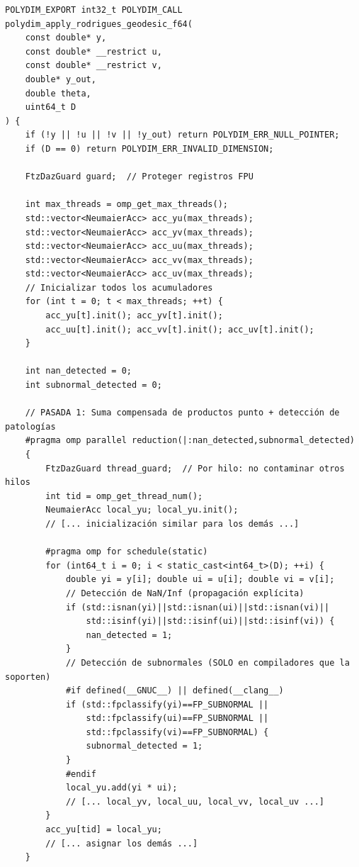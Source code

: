 \begin{lstlisting}[style=cppstyle, caption={Rodrigues Geodésico 2-Pass FMA --- V762}, label=lst:rodrigues_full]
POLYDIM_EXPORT int32_t POLYDIM_CALL 
polydim_apply_rodrigues_geodesic_f64(
    const double* y,
    const double* __restrict u,
    const double* __restrict v,
    double* y_out,
    double theta,
    uint64_t D
) {
    if (!y || !u || !v || !y_out) return POLYDIM_ERR_NULL_POINTER;
    if (D == 0) return POLYDIM_ERR_INVALID_DIMENSION;

    FtzDazGuard guard;  // Proteger registros FPU

    int max_threads = omp_get_max_threads();
    std::vector<NeumaierAcc> acc_yu(max_threads);
    std::vector<NeumaierAcc> acc_yv(max_threads);
    std::vector<NeumaierAcc> acc_uu(max_threads);
    std::vector<NeumaierAcc> acc_vv(max_threads);
    std::vector<NeumaierAcc> acc_uv(max_threads);
    // Inicializar todos los acumuladores
    for (int t = 0; t < max_threads; ++t) {
        acc_yu[t].init(); acc_yv[t].init();
        acc_uu[t].init(); acc_vv[t].init(); acc_uv[t].init();
    }

    int nan_detected = 0;
    int subnormal_detected = 0;

    // PASADA 1: Suma compensada de productos punto + detección de patologías
    #pragma omp parallel reduction(|:nan_detected,subnormal_detected)
    {
        FtzDazGuard thread_guard;  // Por hilo: no contaminar otros hilos
        int tid = omp_get_thread_num();
        NeumaierAcc local_yu; local_yu.init();
        // [... inicialización similar para los demás ...]

        #pragma omp for schedule(static)
        for (int64_t i = 0; i < static_cast<int64_t>(D); ++i) {
            double yi = y[i]; double ui = u[i]; double vi = v[i];
            // Detección de NaN/Inf (propagación explícita)
            if (std::isnan(yi)||std::isnan(ui)||std::isnan(vi)||
                std::isinf(yi)||std::isinf(ui)||std::isinf(vi)) {
                nan_detected = 1;
            }
            // Detección de subnormales (SOLO en compiladores que la soporten)
            #if defined(__GNUC__) || defined(__clang__)
            if (std::fpclassify(yi)==FP_SUBNORMAL ||
                std::fpclassify(ui)==FP_SUBNORMAL ||
                std::fpclassify(vi)==FP_SUBNORMAL) {
                subnormal_detected = 1;
            }
            #endif
            local_yu.add(yi * ui);
            // [... local_yv, local_uu, local_vv, local_uv ...]
        }
        acc_yu[tid] = local_yu;
        // [... asignar los demás ...]
    }


\end{lstlisting}
